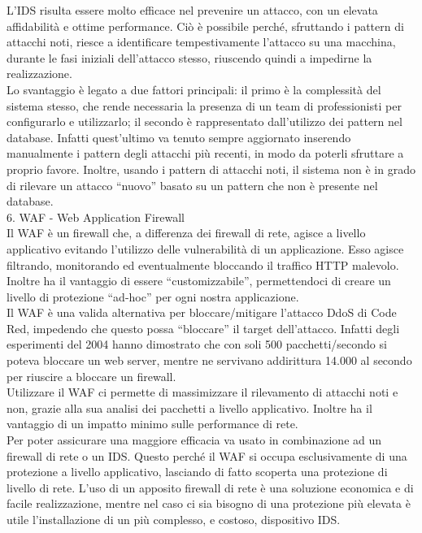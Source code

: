 L’IDS risulta essere molto efficace nel prevenire un attacco, con un elevata affidabilità e ottime performance. Ciò è possibile perché, sfruttando i pattern di attacchi noti, riesce a identificare tempestivamente l’attacco su una macchina, durante le fasi iniziali dell’attacco stesso, riuscendo quindi a impedirne la realizzazione.\\
Lo svantaggio è legato a due fattori principali: il primo è la complessità del sistema stesso, che rende necessaria la presenza di un team di professionisti per configurarlo e utilizzarlo; il secondo è rappresentato dall’utilizzo dei pattern nel database. Infatti quest’ultimo va tenuto sempre aggiornato inserendo manualmente i pattern degli attacchi più recenti, in modo da poterli sfruttare a proprio favore. Inoltre, usando i pattern di attacchi noti, il sistema non è in grado di rilevare un attacco “nuovo” basato su un pattern che non è presente nel database.\\


6. WAF - Web Application Firewall\\
Il WAF è un firewall che, a differenza dei firewall di rete, agisce a livello applicativo evitando l’utilizzo delle vulnerabilità di un applicazione. Esso agisce filtrando, monitorando ed eventualmente bloccando il traffico HTTP malevolo.\\
Inoltre ha il vantaggio di essere “customizzabile”, permettendoci di creare un livello di protezione “ad-hoc” per ogni nostra applicazione.\\

Il WAF è una valida alternativa per bloccare/mitigare l’attacco DdoS di Code Red, impedendo che questo possa “bloccare” il target dell’attacco. Infatti degli esperimenti del 2004 hanno dimostrato che con soli 500 pacchetti/secondo si poteva bloccare un web server, mentre ne servivano addirittura 14.000 al secondo per riuscire a bloccare un firewall.\\

Utilizzare il WAF ci permette di massimizzare il rilevamento di attacchi noti e non, grazie alla sua analisi dei pacchetti a livello applicativo. Inoltre ha il vantaggio di un impatto minimo sulle performance di rete.\\
Per poter assicurare una maggiore efficacia va usato in combinazione ad un firewall di rete o un IDS. Questo perché il WAF si occupa esclusivamente di una protezione a livello applicativo, lasciando di fatto scoperta una protezione di livello di rete. L’uso di un apposito firewall di rete è una soluzione economica e di facile realizzazione, mentre nel caso ci sia bisogno di una protezione più elevata è utile l’installazione di un più complesso, e costoso, dispositivo IDS.\\
